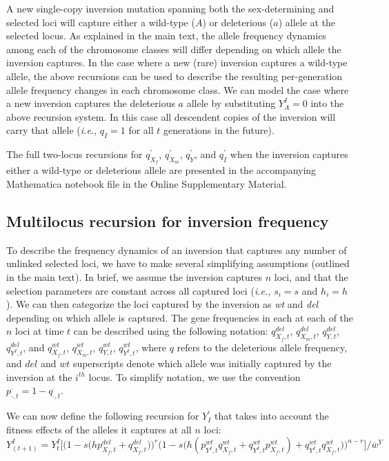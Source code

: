 \documentclass{article}
\begin{document}
\begin{appendices}
A new single-copy inversion mutation spanning both the sex-determining and selected loci will capture either a wild-type ($A$) or deleterious ($a$) allele at the selected locus. As explained in the main text, the allele frequency dynamics among each of the chromosome classes will differ depending on which allele the inversion captures. In the case where a new (rare) inversion captures a wild-type allele, the above recursions can be used to describe the resulting per-generation allele frequency changes in each chromosome class. We can model the case where a new inversion captures the deleterious $a$ allele by substituting $Y^I_A = 0$ into the above recursion system. In this case all descendent copies of the inversion will carry that allele ({\itshape i.e.}, $q_I = 1$ for all $t$ generations in the future). 

The full two-locus recursions for $q^{\prime}_{X_f}$, $q^{\prime}_{X_m}$, $q^{\prime}_Y$, and $q^{\prime}_I$ when the inversion captures either a wild-type or deleterious allele are presented in the accompanying Mathematica notebook file in the Online Supplementary Material. 


\subsection{Multilocus recursion for inversion frequency} \label{subsec:multilocYI}

To describe the frequency dynamics of an inversion that captures any number of unlinked selected loci, we have to make several simplifying assumptions (outlined in the main text). In brief, we assume the inversion captures $n$ loci, and that the selection parameters are constant across all captured loci ({\itshape i.e.,} $s_i = s$ and $h_i = h$). We can then categorize the loci captured by the inversion as {\itshape wt} and {\itshape del} depending on which allele is captured. The gene frequencies in each at each of the $n$ loci at time $t$ can be described using the following notation: $q^{del}_{X_f,t}$, $q^{del}_{X_m,t}$, $q^{del}_{Y,t}$, $q^{del}_{Y^I,t}$, and $q^{wt}_{X_f,t}$, $q^{wt}_{X_m,t}$, $q^{wt}_{Y,t}$, $q^{wt}_{Y^I,t}$, where $q$ refers to the deleterious allele frequency, and $del$ and $wt$ superscripts denote which allele was initially captured by the inversion at the $i^{th}$ locus. To simplify notation, we use the convention $p^{\cdot}_{\cdot,t} = 1 - q^{\cdot}_{\cdot,t}$. 

We can now define the following recursion for $Y^{\prime}_I$ that takes into account the fitness effects of the alleles it captures at all $n$ loci:
\begin{equation} \label{eq:YIprime-multiLoc}
	Y^I_{(t + 1)} = Y^I_t \Bigg[ \Big(1 - s \big(h p^{del}_{X_f,t} + q^{del}_{X_f,t} \big) \Big)^{r}\Big(1 - s \big(h (p^{wt}_{Y^I,t} q^{wt}_{X_f,t} + q^{wt}_{Y^I,t} p^{wt}_{X_f,t}) + q^{wt}_{Y^I,t} q^{wt}_{X_f,t} \big) \Big)^{n-r} \Bigg] \Bigg/ \overline{w}^Y
\end{equation}


\end{appendices}
\end{document}
